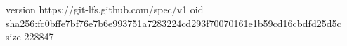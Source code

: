 version https://git-lfs.github.com/spec/v1
oid sha256:fc0bffe7bf76e7b6e993751a7283224cd293f70070161e1b59cd16cbdfd25d5c
size 228847
